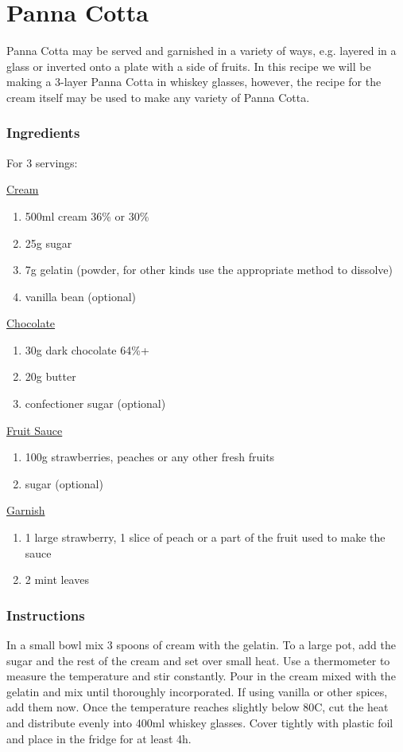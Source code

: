 \documentclass[11pt]{report}
\newcommand{\header}[1]{\subsubsection*{#1}}
\newcommand{\ingredientsection}[1]{\medskip\noindent\underline{#1}\medskip}
\begin{document}
\section{Panna Cotta}
Panna Cotta may be served and garnished in a variety of ways, e.g. layered in a
glass or inverted onto a plate with a side of fruits. In this recipe we will be
making a 3-layer Panna Cotta in whiskey glasses, however, the recipe for the
cream itself may be used to make any variety of Panna Cotta.
\header{Ingredients}
For 3 servings:

\ingredientsection{Cream}
\begin{enumerate}
  \item 500ml cream 36\% or 30\%
  \item 25g sugar
  \item 7g gelatin (powder, for other kinds use the appropriate method to
  dissolve)
  \item vanilla bean (optional)
\end{enumerate}

\ingredientsection{Chocolate}
\begin{enumerate}
  \item 30g dark chocolate 64\%+
  \item 20g butter
  \item confectioner sugar (optional)
\end{enumerate}

\ingredientsection{Fruit Sauce}
\begin{enumerate}
  \item 100g strawberries, peaches or any other fresh fruits
  \item sugar (optional)
\end{enumerate}

\ingredientsection{Garnish}
\begin{enumerate}
  \item 1 large strawberry, 1 slice of peach or a part of the fruit used to
  make the sauce
  \item 2 mint leaves
\end{enumerate}

\header{Instructions}
In a small bowl mix 3 spoons of cream with the gelatin. To a large pot, add the
sugar and the rest of the cream and set over small heat. Use a thermometer to
measure the temperature and stir constantly. Pour in the cream mixed with the
gelatin and mix until thoroughly incorporated. If using vanilla or other
spices, add them now. Once the temperature reaches slightly below 80C, cut the
heat and distribute evenly into 400ml whiskey glasses. Cover tightly with
plastic foil and place in the fridge for at least 4h.
\end{document}
